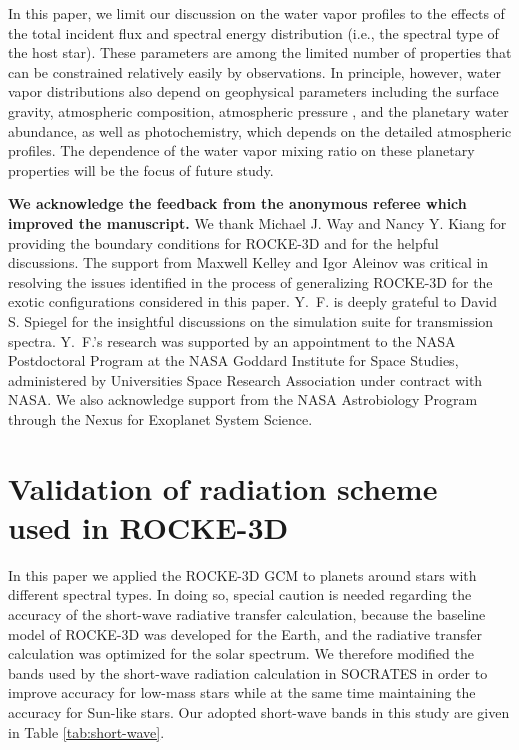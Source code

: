 \documentclass[11pt,numberedappendix,twocolappendix,]{emulateapj}
\def\modelE{ROCKE-3D}
\def\wv{water vapor}
\def\revise#1{{\bf #1}}
\begin{document}
In this paper, we limit our discussion on the \wv{} profiles to the effects of the total incident flux and spectral energy distribution (i.e., the spectral type of the host star). 
These parameters are among the limited number of properties that can be constrained relatively easily by observations. 
In principle, however, \wv{} distributions also depend on geophysical parameters including the surface gravity, atmospheric composition, atmospheric pressure \revise{\citep[e.g.,][]{Turbet2016}}, and the planetary water abundance, as well as photochemistry, which depends on the detailed atmospheric profiles. 
The dependence of the \wv{} mixing ratio on these planetary properties will be  the focus of future study. 


\acknowledgments
\revise{We acknowledge the feedback from the anonymous referee which improved the manuscript. }
We thank Michael J. Way and Nancy Y. Kiang for providing the boundary conditions for \modelE{} and for the helpful discussions. 
The support from Maxwell Kelley and Igor Aleinov was critical in resolving the issues identified in the process of generalizing \modelE{} for the exotic configurations considered in this paper. 
Y.~F. is deeply grateful to David S. Spiegel for the insightful discussions on the simulation suite for transmission spectra. 
Y.~F.'s research was supported by an appointment to the NASA Postdoctoral Program at the NASA Goddard Institute for Space Studies, administered by Universities Space Research Association under contract with NASA. 
We also acknowledge support from the NASA Astrobiology Program through the Nexus for Exoplanet System Science.




\appendix


\section{Validation of radiation scheme\\used in \revise{\modelE{}} }
\label{ap:radiation}

In this paper we applied the ROCKE-3D GCM to planets around stars with different spectral types. 
In doing so, special caution is needed regarding the accuracy of the short-wave radiative transfer calculation, because the baseline model of ROCKE-3D was  developed for the Earth, and the radiative transfer calculation was optimized for the solar spectrum. 
We therefore modified the bands used by the short-wave radiation calculation in SOCRATES in order to improve accuracy for low-mass stars while at the same time maintaining the accuracy for Sun-like stars.
Our adopted short-wave bands in this study are given in Table \ref{tab:short-wave}.
\end{document}
